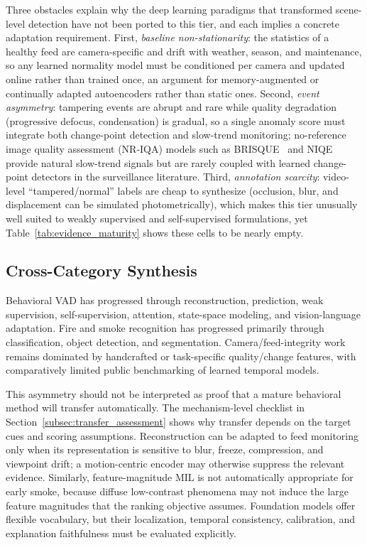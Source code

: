 \documentclass[10pt,a4paper]{article}
\begin{document}
Three obstacles explain why the deep learning paradigms that transformed scene-level detection have not been ported to this tier, and each implies a concrete adaptation requirement. First, \emph{baseline non-stationarity}: the statistics of a healthy feed are camera-specific and drift with weather, season, and maintenance, so any learned normality model must be conditioned per camera and updated online rather than trained once, an argument for memory-augmented or continually adapted autoencoders rather than static ones. Second, \emph{event asymmetry}: tampering events are abrupt and rare while quality degradation (progressive defocus, condensation) is gradual, so a single anomaly score must integrate both change-point detection and slow-trend monitoring; no-reference image quality assessment (NR-IQA) models such as BRISQUE~\citep{mittal2012brisque} and NIQE~\citep{mittal2013niqe} provide natural slow-trend signals but are rarely coupled with learned change-point detectors in the surveillance literature. Third, \emph{annotation scarcity}: video-level ``tampered/normal'' labels are cheap to synthesize (occlusion, blur, and displacement can be simulated photometrically), which makes this tier unusually well suited to weakly supervised and self-supervised formulations, yet Table~\ref{tab:evidence_maturity} shows these cells to be nearly empty.


\subsection{Cross-Category Synthesis}
\label{subsec:cross_category}
Behavioral VAD has progressed through reconstruction, prediction, weak supervision, self-supervision, attention, state-space modeling, and vision-language adaptation. Fire and smoke recognition has progressed primarily through classification, object detection, and segmentation. Camera/feed-integrity work remains dominated by handcrafted or task-specific quality/change features, with comparatively limited public benchmarking of learned temporal models.

This asymmetry should not be interpreted as proof that a mature behavioral method will transfer automatically. The mechanism-level checklist in Section~\ref{subsec:transfer_assessment} shows why transfer depends on the target cues and scoring assumptions. Reconstruction can be adapted to feed monitoring only when its representation is sensitive to blur, freeze, compression, and viewpoint drift; a motion-centric encoder may otherwise suppress the relevant evidence. Similarly, feature-magnitude MIL is not automatically appropriate for early smoke, because diffuse low-contrast phenomena may not induce the large feature magnitudes that the ranking objective assumes. Foundation models offer flexible vocabulary, but their localization, temporal consistency, calibration, and explanation faithfulness must be evaluated explicitly.
\end{document}
